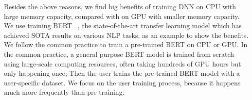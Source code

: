 

\textcolor{check}{Besides the above reasons, we find big benefits of training DNN on CPU with large memory capacity, compared with on GPU with smaller memory capacity. We use training BERT~\cite{devlin2018bert}
\textcolor{check}{, the state-of-the-art transfer learning model which has achieved SOTA results on various NLP tasks,} as an example to show the benefits. We follow the common practice to %
\textcolor{check}{train} a pre-trained BERT on CPU or GPU. In the common practice, a general purpose BERT model is trained from scratch using large-scale computing resources\textcolor{check}{, often taking hundreds of GPU hours but only happening once}; Then the user %
\textcolor{check}{trains} the pre-trained BERT model with a user-specific dataset. We focus on the user \textcolor{check}{training} %
process, because it happens much more frequently than pre-training.}




